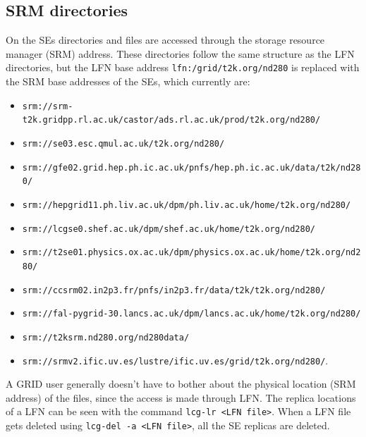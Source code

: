 \documentclass[11pt]{article}
\begin{document}
\subsection{SRM directories}

On the SEs directories and files are accessed through the storage
resource manager (SRM) address.
These directories follow the same structure as the LFN directories,
but the LFN base address \verb+lfn:/grid/t2k.org/nd280+ is replaced
with the SRM base addresses of the SEs, which currently are:
\begin{itemize}
\item \verb+srm://srm-t2k.gridpp.rl.ac.uk/castor/ads.rl.ac.uk/prod/t2k.org/nd280/+
\item \verb+srm://se03.esc.qmul.ac.uk/t2k.org/nd280/+
\item \verb+srm://gfe02.grid.hep.ph.ic.ac.uk/pnfs/hep.ph.ic.ac.uk/data/t2k/nd280/+
\item \verb+srm://hepgrid11.ph.liv.ac.uk/dpm/ph.liv.ac.uk/home/t2k.org/nd280/+
\item \verb+srm://lcgse0.shef.ac.uk/dpm/shef.ac.uk/home/t2k.org/nd280/+
\item \verb+srm://t2se01.physics.ox.ac.uk/dpm/physics.ox.ac.uk/home/t2k.org/nd280/+
\item \verb+srm://ccsrm02.in2p3.fr/pnfs/in2p3.fr/data/t2k/t2k.org/nd280/+
\item \verb+srm://fal-pygrid-30.lancs.ac.uk/dpm/lancs.ac.uk/home/t2k.org/nd280/+
\item \verb+srm://t2ksrm.nd280.org/nd280data/+
\item \verb+srm://srmv2.ific.uv.es/lustre/ific.uv.es/grid/t2k.org/nd280/+.
\end{itemize}

A GRID user generally doesn't have to bother about the physical
location (SRM address) of the files, since the access is made through
LFN. The replica locations of a LFN can be seen with the command
\verb+lcg-lr <LFN file>+. When a LFN file gets deleted using
\verb+lcg-del -a <LFN file>+, all the SE replicas are deleted.
\end{document}

